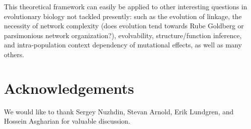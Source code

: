 \documentclass{article}
\newcommand{\plr}[1]{\todo[color=blue!25]{#1}}
\newcommand{\plr}[1]{{\color{blue}\it #1}}
\newcommand{\jss}[1]{{\color{olive}\it #1}}
\newcommand{\1}{\mathbbm{1}}
\begin{document}
This theoretical framework can easily be applied to other interesting questions in evolutionary biology not tackled presently: such as the evolution of linkage, the necessity of network complexity (does evolution tend towards Rube Goldberg or parsimonious network organization?), evolvability, structure/function inference, and intra-population context dependency of mutational effects, as well as many others.

%

\section*{Acknowledgements}
We would like to thank Sergey Nuzhdin, Stevan Arnold, Erik Lundgren, and Hossein Asgharian for valuable discussion.




\normalsize
\end{document}
